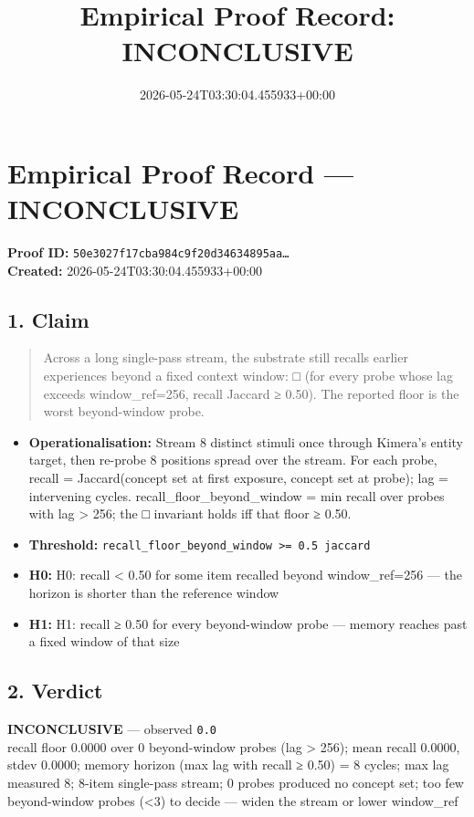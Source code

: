 \documentclass{article}
\title{Empirical Proof Record: INCONCLUSIVE}
\date{2026-05-24T03:30:04.455933+00:00}
\begin{document}
\maketitle
\section*{Empirical Proof Record --- \textcolor{inconclusive}{\textbf{INCONCLUSIVE}}}
\textbf{Proof ID:} \texttt{50e3027f17cba984c9f20d34634895aa\dots}\\
\textbf{Created:} 2026-05-24T03:30:04.455933+00:00
\subsection*{1. Claim}
\begin{quote}Across a long single-pass stream, the substrate still recalls earlier experiences beyond a fixed context window: □ (for every probe whose lag exceeds window\_ref=256, recall Jaccard ≥ 0.50). The reported floor is the worst beyond-window probe.\end{quote}
\begin{itemize}
\item \textbf{Operationalisation:} Stream 8 distinct stimuli once through Kimera's entity target, then re-probe 8 positions spread over the stream. For each probe, recall = Jaccard(concept set at first exposure, concept set at probe); lag = intervening cycles. recall\_floor\_beyond\_window = min recall over probes with lag > 256; the □ invariant holds iff that floor ≥ 0.50.
\item \textbf{Threshold:} \texttt{recall\_floor\_beyond\_window >= 0.5 jaccard}
\item \textbf{H0:} H0: recall < 0.50 for some item recalled beyond window\_ref=256 — the horizon is shorter than the reference window
\item \textbf{H1:} H1: recall ≥ 0.50 for every beyond-window probe — memory reaches past a fixed window of that size
\end{itemize}
\subsection*{2. Verdict}
\textcolor{inconclusive}{\textbf{INCONCLUSIVE}} --- observed \texttt{0.0}\\
recall floor 0.0000 over 0 beyond-window probes (lag > 256); mean recall 0.0000, stdev 0.0000; memory horizon (max lag with recall ≥ 0.50) = 8 cycles; max lag measured 8; 8-item single-pass stream; 0 probes produced no concept set; too few beyond-window probes (<3) to decide — widen the stream or lower window\_ref
\end{document}
